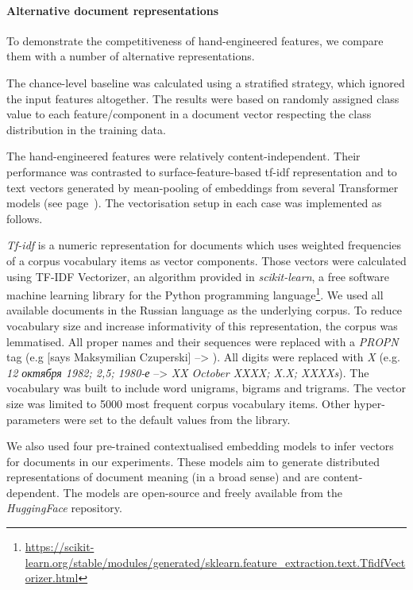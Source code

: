 \paragraph{\label{pg:vectors}Alternative document representations} To demonstrate the competitiveness of hand-engineered features, we compare them with a number of alternative representations. 

The chance-level baseline was calculated using a stratified strategy, which ignored the input features altogether. The results were based on randomly assigned class value to each feature/component in a document vector respecting the class distribution in the training data.

The hand-engineered features were relatively content-independent. Their performance was contrasted to surface-feature-based \gls*{tf-idf} representation and to text vectors generated by mean-pooling of embeddings from several Transformer models (see page~\pageref{pg:embeddings}).
The vectorisation setup in each case was implemented as follows.

\label{pg:tfidf_meth}
\textit{Tf-idf} is a numeric representation for documents which uses weighted frequencies of a corpus vocabulary items as vector components. Those vectors were calculated using TF-IDF Vectorizer, an algorithm provided in \textit{scikit-learn}, a free software machine learning library for the Python programming language\footnote{\url{https://scikit-learn.org/stable/modules/generated/sklearn.feature\_extraction.text.TfidfVectorizer.html}}. We used all available documents in the Russian language as the underlying corpus. 
To reduce vocabulary size and increase informativity of this representation, the corpus was lemmatised. All proper names and their sequences were replaced with a \textit{PROPN} tag (e.g  [says Maksymilian Czuperski] --> ). All digits were replaced with \textit{X} (e.g. \textit{12 октября 1982; 2,5;  1980-е} --> \textit{XX October XXXX; X.X; XXXXs}). The vocabulary was built to include word unigrams, bigrams and trigrams. The vector size was limited to 5000 most frequent corpus vocabulary items. Other hyper-parameters were set to the default values from the library. 

We also used four pre-trained contextualised embedding models to infer vectors for documents in our experiments. These models aim to generate distributed representations of document meaning (in a broad sense) and are content-dependent. The models are open-source and freely available from the \textit{HuggingFace} repository.

